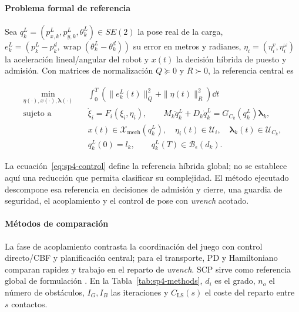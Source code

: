 \paragraph{Problema formal de referencia}

Sea $q_k^L=(p_{x,k}^L,p_{y,k}^L,\theta_k^L)\in SE(2)$ la pose real de la carga, $e_k^L=(p_k^L-p_k^d,\operatorname{wrap}(\theta_k^L-\theta_k^d))$ su error en metros y radianes, $\eta_i=(\eta_i^v,\eta_i^\omega)$ la aceleración lineal/angular del robot y $x(t)$ la decisión híbrida de puesto y admisión. Con matrices de normalización $Q\succeq0$ y $R\succ0$, la referencia central es

\begin{equation}
\label{eq:sp4-control}
\begin{aligned}
  \min_{\eta(\cdot),x(\cdot),\boldsymbol\lambda(\cdot)}\quad
  & \int_{0}^{T}\!\left(\|e_k^L(t)\|_{Q}^{2}
    +\|\eta(t)\|_{R}^{2}\right)\dd t \\
  \text{sujeto a}\quad
  & \dot\xi_i=F_i(\xi_i,\eta_i),\qquad
    M_k\ddot q_k^L+D_k\dot q_k^L=G_{C_k}(q_k^L)\boldsymbol\lambda_k,\\
  & x(t)\in\mathcal X_{\mathrm{mech}}(q_k^L),\quad
    \eta_i(t)\in\mathcal U_i,\quad
    \boldsymbol\lambda_k(t)\in\mathcal U_{C_k},\\
  & q_k^L(0)=l_k,\qquad q_k^L(T)\in\mathcal B_{\epsilon}(d_k).
\end{aligned}
\end{equation}

La ecuación~\eqref{eq:sp4-control} define la referencia híbrida global; no se establece aquí una reducción que permita clasificar su complejidad. El método ejecutado descompone esa referencia en decisiones de admisión y cierre, una guardia de seguridad, el acoplamiento y el control de pose con \emph{wrench} acotado.

\paragraph{Métodos de comparación}

La fase de acoplamiento contrasta la coordinación del juego con control directo/CBF y planificación central; para el transporte, PD y Hamiltoniano comparan rapidez y trabajo en el reparto de \emph{wrench}. SCP sirve como referencia global de formulación \parencite{alonsomora2017transport}. En la Tabla~\ref{tab:sp4-methods}, $d_i$ es el grado, $n_o$ el número de obstáculos, $I_G,I_B$ las iteraciones y $C_{\mathrm{LS}}(s)$ el coste del reparto entre $s$ contactos.


